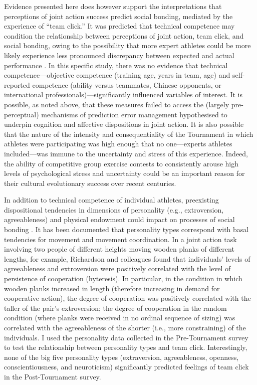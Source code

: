 \begin{CJK}{UTF8}{gbsn}
  Evidence presented here does however support the interpretations that perceptions of joint action success predict social bonding, mediated by the experience of ``team click.'' It was predicted that technical competence may condition the relationship between perceptions of joint action, team click, and social bonding, owing to the possibility that more expert athletes could be more likely experience less pronounced discrepancy between expected and actual performance \cite{Tomeo2012}.  In this specific study, there was no evidence that technical competence---objective competence (training age, years in team, age) and self-reported competence (ability versus teammates, Chinese opponents, or international professionals)---significantly influenced variables of interest.  It is possible, as noted above, that these measures failed to access the (largely pre-perceptual) mechanisms of prediction error management hypothesised to underpin cognition and affective dispositions in joint action.  It is also possible that the nature of the intensity and consequentiality of the Tournament in which athletes were participating was high enough that no one---experts athletes included---was immune to the uncertainty and stress of this experience. Indeed, the ability of competitive group exercise contests to consistently arouse high levels of psychological stress and uncertainty could be an important reason for their cultural evolutionary success over recent centuries.

  In addition to technical competence of individual athletes, preexisting dispositional tendencies in dimensions of personality (e.g., extroversion, agreeableness) and physical endowment could impact on processes of social bonding \citep{Marsh2009,VonRueden2015}.   It has been documented that personality types correspond with basal tendencies for movement and movement coordination. In a joint action task involving two people of different heights moving wooden planks of different lengths, for example, Richardson and colleagues \textcite{Richardson2007} found that individuals’ levels of agreeableness and extroversion were positively correlated with the level of persistence of cooperation (hyteresis).  In particular, in the condition in which wooden planks increased in length (therefore increasing in demand for cooperative action), the degree of cooperation was positively correlated with the taller of the pair’s extroversion; the degree of cooperation in the random condition (where planks were received in no ordinal sequence of sizing) was correlated with the agreeableness of the shorter (i.e., more constraining) of the individuals.  I used the personality data collected in the Pre-Tournament survey to test the relationship between personality types and team click. Interestingly, none of the big five personality types (extraversion, agreeableness, openness, conscientiousness, and neuroticism) significantly predicted feelings of team click in the Post-Tournament survey.


\end{CJK}
